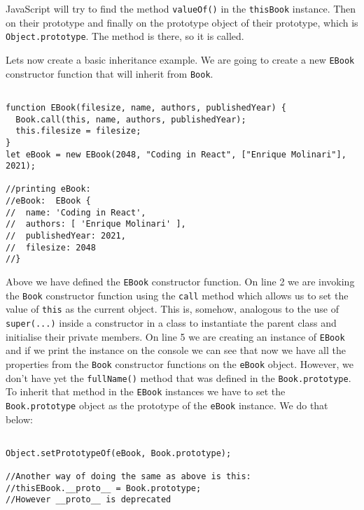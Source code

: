 \documentclass[a4paper, oneside, titlepage, 12pt]{book}
\begin{document}
JavaScript will try to find the method \texttt{valueOf()} in the \texttt{thisBook} instance. Then on their prototype and finally on the prototype object of their prototype, which is \texttt{Object.prototype}. The method is there, so it is called.

Lets now create a basic inheritance example. We are going to create a new \texttt{EBook} constructor function that will inherit from \texttt{Book}.

\begin{verbatim}

function EBook(filesize, name, authors, publishedYear) {
  Book.call(this, name, authors, publishedYear);
  this.filesize = filesize;
}
let eBook = new EBook(2048, "Coding in React", ["Enrique Molinari"], 2021);

//printing eBook:
//eBook:  EBook {
//  name: 'Coding in React',
//  authors: [ 'Enrique Molinari' ],
//  publishedYear: 2021,
//  filesize: 2048
//}
\end{verbatim}

Above we have defined the \texttt{EBook} constructor function. On line 2 we are invoking the \texttt{Book} constructor function using the \texttt{call} method which allows us to set the value of \texttt{this} as the current object. This is, somehow, analogous to the use of \texttt{super(...)} inside a constructor in a class to instantiate the parent class and initialise their private members. On line 5 we are creating an instance of \texttt{EBook} and if we print the instance on the console we can see that now we have all the properties from the \texttt{Book} constructor functions on the \texttt{eBook} object. However, we don't have yet the \texttt{fullName()} method that was defined in the \texttt{Book.prototype}. To inherit that method in the \texttt{EBook} instances we have to set the \texttt{Book.prototype} object as the prototype of the \texttt{eBook} instance. We do that below:

\begin{verbatim}

Object.setPrototypeOf(eBook, Book.prototype);

//Another way of doing the same as above is this:
//thisEBook.__proto__ = Book.prototype;
//However __proto__ is deprecated
\end{verbatim}
\end{document}

